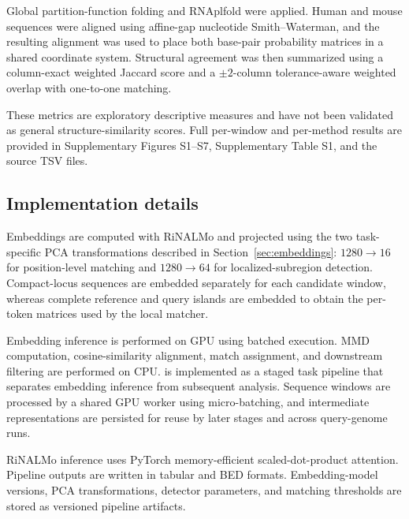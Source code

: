 Global partition-function folding and RNAplfold were applied. Human and mouse
sequences were aligned using affine-gap nucleotide Smith--Waterman, and the
resulting alignment was used to place both base-pair probability matrices in a
shared coordinate system. Structural agreement was then summarized using a
column-exact weighted Jaccard score and a $\pm2$-column tolerance-aware weighted
overlap with one-to-one matching.

These metrics are exploratory descriptive measures and have not been validated as
general structure-similarity scores. Full per-window and per-method results are
provided in Supplementary Figures S1--S7, Supplementary Table S1, and the source
TSV files.

\subsection{Implementation details}
\label{sec:impl}

Embeddings are computed with RiNALMo and projected using the two task-specific PCA
transformations described in Section~\ref{sec:embeddings}: $1280 \to 16$ for
position-level matching and $1280 \to 64$ for localized-subregion detection.
Compact-locus sequences are embedded separately for each candidate window,
whereas complete reference and query islands are embedded to obtain the per-token
matrices used by the local matcher.

Embedding inference is performed on GPU using batched execution. MMD computation,
cosine-similarity alignment, match assignment, and downstream filtering are
performed on CPU. \curia{} is implemented as a staged task pipeline that separates
embedding inference from subsequent analysis. Sequence windows are processed by a
shared GPU worker using micro-batching, and intermediate representations are
persisted for reuse by later stages and across query-genome runs.

RiNALMo inference uses PyTorch memory-efficient scaled-dot-product attention.
Pipeline outputs are written in tabular and BED formats. Embedding-model versions,
PCA transformations, detector parameters, and matching thresholds are stored as
versioned pipeline artifacts.
